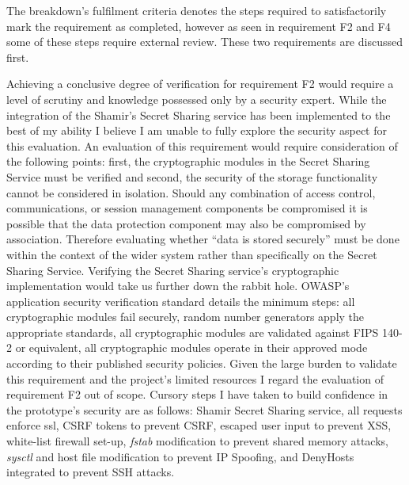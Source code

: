 The breakdown's fulfilment criteria denotes the steps required to satisfactorily mark the requirement as completed, however as seen in requirement F2 and F4 some of these steps require external review. These two requirements are discussed first.

Achieving a conclusive degree of verification for requirement F2 would require a level of scrutiny and knowledge possessed only by a security expert. While the integration of the Shamir's Secret Sharing service has been implemented to the best of my ability I believe I am unable to fully explore the security aspect for this evaluation. An evaluation of this requirement would require consideration of the following points: first, the cryptographic modules in the Secret Sharing Service must be verified and second, the security of the storage functionality cannot be considered in isolation. Should any combination of access control, communications, or session management components be compromised it is possible that the data protection component may also be compromised by association. Therefore evaluating whether ``data is stored securely'' must be done within the context of the wider system rather than specifically on the Secret Sharing Service. Verifying the Secret Sharing service's cryptographic implementation would take us further down the rabbit hole. OWASP's application security verification standard \cite{OWASP:online} details the minimum steps: all cryptographic modules fail securely, random number generators apply the appropriate standards, all cryptographic modules are validated against FIPS 140-2 or equivalent, all cryptographic modules operate in their approved mode according to their published security policies. Given the large burden to validate this requirement and the project's limited resources I regard the evaluation of requirement F2 out of scope. Cursory steps I have taken to build confidence in the prototype's security are as follows: Shamir Secret Sharing service, all requests enforce ssl, CSRF tokens to prevent CSRF, escaped user input to prevent XSS, 
white-list firewall set-up, \textit{fstab} modification to prevent shared memory attacks, \textit{sysctl} and host file modification to prevent IP Spoofing, and DenyHosts \cite{DenyH6:online} integrated to prevent SSH attacks.

